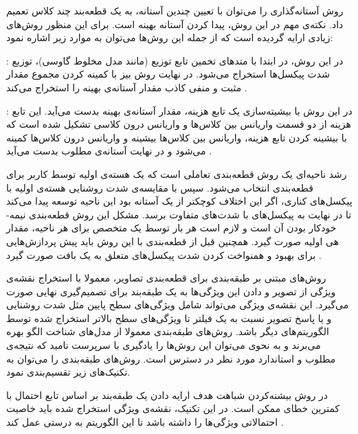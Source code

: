 روش آستانه‌گذاری را می‌توان با تعیین چندین آستانه، به یک قطعه‌بند چند کلاس تعمیم داد. نکته‌ی مهم در این روش، پیدا کردن آستانه بهینه است. برای این منظور روش‌های زیادی ارایه گردیده‌ است که از جمله این روش‌ها می‌توان به موارد زیر اشاره نمود:

 : در این روش، در ابتدا با متدهای تخمین تابع توزیع (مانند مدل مخلوط گاوسی)، توزیع شدت پیکسل‌ها استخراج می‌شود. در نهایت روش بیز با کمینه کردن مجموع مقدار  مثبت و منفی کاذب مقدار آستانه‌ی بهینه را استخراج می‌کند .

 : در این روش با بیشیته‌سازی یک تابع هزینه، مقدار آستانه‌ی بهینه بدست می‌آید. این تابع هزینه از دو قسمت واریانس بین کلاس‌ها و واریانس درون کلاسی تشکیل شده است که با بیشینه کردن تابع هزینه، واریانس بین کلاس‌ها بیشینه و واریانس درون کلاس‌ها کمینه می‌شود و در نهایت آستانه‌ی مطلوب بدست می‌آید .

رشد ناحیه‌ای یک روش قطعه‌بندی تعاملی است که یک هسته‌ی اولیه توسط کاربر برای قطعه‌بندی انتخاب می‌شود. سپس با مقایسه‌ی شدت روشنایی هسته‌ی اولیه با پیکسل‌های کناری، اگر این اختلاف کوچکتر از یک آستانه بود این ناحیه توسعه پیدا می‌کند تا در نهایت به پیکسل‌های با شدت‌های متفاوت برسد. مشکل این روش قطعه‌بندی نیمه-خودکار بودن آن است و لازم است هر بار توسط یک متخصص برای هر ناحیه، مقدار هی اولیه صورت گیرد. همچنین قبل از قطعه‌بندی با این روش باید پیش پردازش‌هایی برای بهبود و همنواخت کردن شدت پیکسل‌های متعلق به یک بافت صورت گیرد .

روش‌های مبتنی بر طبقه‌بندی برای قطعه‌بندی تصاویر، معمولا با استخراج نقشه‌ی ویژگی از تصویر و دادن این ویژگی‌ها به یک طبقه‌بند برای تصمیم‌گیری نهایی صورت می‌گیرد. این نقشه‌ی ویژگی می‌تواند شامل ویژگی‌های سطح پایین مثل شدت روشنایی و یا پاسخ تصویر نسبت به یک فیلتر تا ویژگی‌های سطح بالاتر استخراج شده توسط الگوریتم‌های دیگر باشد. روش‌های طبقه‌بندی معمولا از مدل‌های شناخت الگو بهره می‌برند و به نحوی می‌توان این روش‌ها را یادگیری با سرپرست نامید که نتیجه‌ی مطلوب و استاندارد مورد نظر در دسترس است. روش‌های طبقه‌بندی را می‌توان به تکنیک‌های زیر تقسیم‌بندی نمود.

در روش‌‌ بیشنه‌کردن شباهت هدف ارایه دادن یک طبقه‌بند بر اساس تابع احتمال با کمترین خطای ممکن است. در این تکنیک، نقشه‌ی ویژگی استخراج شده باید خاصیت احتمالاتی ویژگی‌ها را داشته باشد تا این الگوریتم به درستی عمل کند .

